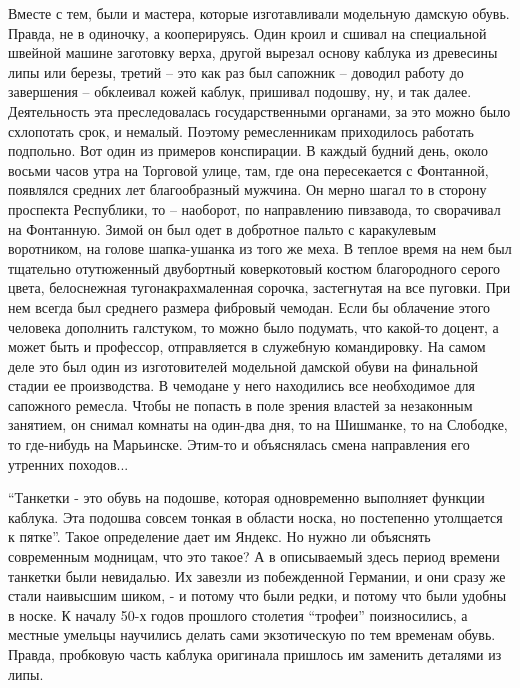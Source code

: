 Вместе с тем, были и мастера, которые изготавливали модельную дамскую обувь.
Правда, не в одиночку, а кооперируясь. Один кроил и сшивал на специальной
швейной машине заготовку верха, другой вырезал основу каблука из древесины липы
или березы, третий – это как раз был сапожник –  доводил работу до завершения –
обклеивал кожей каблук, пришивал подошву, ну, и так далее. Деятельность эта
преследовалась государственными органами, за это можно было схлопотать срок, и
немалый. Поэтому ремесленникам приходилось работать подпольно. Вот один из
примеров конспирации. В каждый будний день, около восьми часов утра на Торговой
улице, там, где она пересекается с Фонтанной, появлялся средних лет
благообразный мужчина. Он мерно шагал то в сторону проспекта Республики, то –
наоборот, по направлению пивзавода, то сворачивал на Фонтанную. Зимой он был
одет в добротное пальто с каракулевым воротником, на голове шапка-ушанка из
того же меха. В теплое время на нем был тщательно отутюженный двубортный
коверкотовый костюм благородного серого цвета, белоснежная тугонакрахмаленная
сорочка, застегнутая на все пуговки. При нем всегда был среднего размера
фибровый чемодан. Если бы облачение этого человека дополнить галстуком, то
можно было подумать, что какой-то доцент, а может быть и профессор,
отправляется в служебную  командировку. На самом деле это был один из
изготовителей модельной дамской обуви на финальной стадии ее производства. В
чемодане у него находились все необходимое для сапожного ремесла. Чтобы не
попасть в поле зрения властей за незаконным занятием, он снимал комнаты на
один-два дня, то на Шишманке, то на Слободке, то где-нибудь на Марьинске.
Этим-то и  объяснялась смена направления его утренних походов...

\enquote{Танкетки - это обувь на подошве, которая одновременно выполняет функции
каблука. Эта подошва совсем тонкая в области носка, но постепенно утолщается к
пятке}.  Такое определение дает им Яндекс. Но нужно ли объяснять современным
модницам, что это такое? А в описываемый здесь период времени танкетки были
невидалью. Их завезли из побежденной Германии, и они сразу же стали наивысшим
шиком, - и потому что были редки, и потому что были удобны в носке. К началу
50-х годов прошлого столетия \enquote{трофеи} поизносились, а местные умельцы научились
делать сами экзотическую по тем временам обувь. Правда, пробковую часть каблука
оригинала пришлось им  заменить деталями из липы. 

